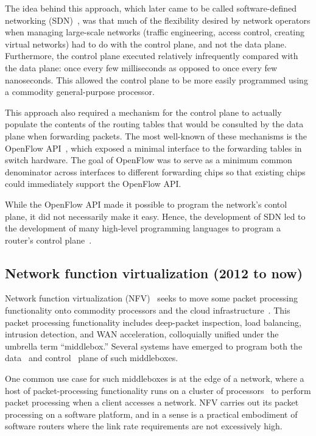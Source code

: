 The idea behind this approach, which later came to be called software-defined
networking (SDN)~\cite{sdn_coining}, was that much of the flexibility desired by
network operators when managing large-scale networks (\eg traffic engineering,
access control, creating virtual networks) had to do with the control plane,
and not the data plane.  Furthermore, the control plane executed relatively
infrequently compared with the data plane: once every few milliseconds as
opposed to once every few nanoseconds. This allowed the control plane to be
more easily programmed using a commodity general-purpose processor.

This approach also required a mechanism for the control plane to actually
populate the contents of the routing tables that would be consulted by the data
plane when forwarding packets. The most well-known of these mechanisms is the
OpenFlow API~\cite{openflow}, which exposed a minimal interface to the
forwarding tables in switch hardware. The goal of OpenFlow was to serve as a
minimum common denominator across interfaces to different forwarding chips so
that existing chips could immediately support the OpenFlow API.

While the OpenFlow API made it possible to program the network's contol plane,
it did not necessarily make it easy. Hence, the development of SDN led to the
development of many high-level programming languages to program a router's
control plane~\cite{frenetic, pyretic}.

\subsection{Network function virtualization (2012 to now)}

Network function virtualization (NFV)~\cite{nfv_etsi_2012} seeks to move some
packet processing functionality onto commodity processors and the cloud
infrastructure~\cite{aplomb}. This packet processing functionality includes
deep-packet inspection, load balancing, intrusion detection, and WAN
acceleration, colloquially unified under the umbrella term ``middlebox.''
Several systems have emerged to program both the data~\cite{netbricks} and
control~\cite{opennf} plane of such middleboxes.

One common use case for such middleboxes is at the edge of a network, where a
host of packet-processing functionality runs on a cluster of
processors~\cite{e2} to perform packet processing when a client accesses a
network. NFV carries out its packet processing on a software platform, and in a
sense is a practical embodiment of software routers where the link rate
requirements are not excessively high.

